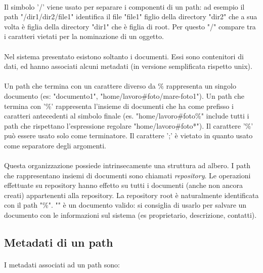 \documentclass{article}
\begin{document}
\paragraph{} Il simbolo '/' viene usato per separare i componenti di un path: ad esempio il path "/dir1/dir2/file1" identifica il file "file1" figlio della directory "dir2" che a sua volta è figlia della directory "dir1" che è figlia di root. Per questo "/" compare tra i caratteri vietati per la nominazione di un oggetto.  

\paragraph{} Nel sistema presentato esistono soltanto i documenti. Essi sono contenitori di dati, ed hanno associati alcuni metadati (in versione semplificata rispetto unix). 

\paragraph{} Un path che termina con un carattere diverso da $\%$ rappresenta un singolo documento (es: "documento1", "home/lavoro\#foto/mare-foto1"). Un path che termina con '\%' rappresenta l'insieme di documenti che ha come prefisso i caratteri antecedenti al simbolo finale (es. "home/lavoro\#foto\%" include tutti i path che rispettano l'espressione regolare "home/lavoro\#foto*"). Il carattere '\%' può essere usato solo come terminatore. Il carattere ';' è vietato in quanto usato come separatore degli argomenti. 

\paragraph{} Questa organizzazione possiede intrinsecamente una struttura ad albero. I path che rappresentano insiemi di documenti sono chiamati \emph{repository}. Le operazioni effettuate su repository hanno effetto su tutti i documenti (anche non ancora creati) appartenenti alla repository. La repository root è naturalmente identificata con il path "\%". "" è un documento valido: si consiglia di usarlo per salvare un documento con le informazioni sul sistema (es proprietario, descrizione, contatti). 

\subsection{Metadati di un path}

\paragraph{} I metadati associati ad un path sono: 
\end{document}
